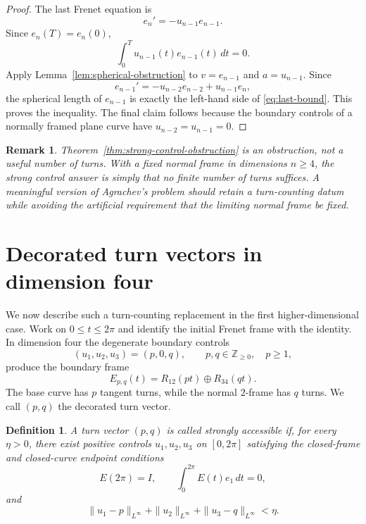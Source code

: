 \documentclass[10pt,a4paper]{amsart}
\newtheorem{definition}[theorem]{Definition}
\newtheorem{remark}[theorem]{Remark}
\begin{document}
\begin{proof}
The last Frenet equation is
\[
        e_n'=-u_{n-1}e_{n-1}.
\]
Since $e_n(T)=e_n(0)$,
\[
        \int_0^T u_{n-1}(t)e_{n-1}(t)\,dt=0.
\]
Apply Lemma~\ref{lem:spherical-obstruction} to $v=e_{n-1}$ and $a=u_{n-1}$.  Since
\[
        e_{n-1}'=-u_{n-2}e_{n-2}+u_{n-1}e_n,
\]
the spherical length of $e_{n-1}$ is exactly the left-hand side of
\eqref{eq:last-bound}.  This proves the inequality.  The final claim follows because
the boundary controls of a normally framed plane curve have $u_{n-2}=u_{n-1}=0$.
\end{proof}

\begin{remark}\label{rem:why-not-number}
Theorem~\ref{thm:strong-control-obstruction} is an obstruction, not a useful number
of turns.  With a fixed normal frame in dimensions $n\ge4$, the strong control answer
is simply that no finite number of turns suffices.  A meaningful version of
Agrachev's problem should retain a turn-counting datum while avoiding the artificial
requirement that the limiting normal frame be fixed.
\end{remark}

\section{Decorated turn vectors in dimension four}

We now describe such a turn-counting replacement in the first higher-dimensional
case.  Work on $0\le t\le2\pi$ and identify the initial Frenet frame with the identity.
In dimension four the degenerate boundary controls
\begin{equation}\label{eq:decorated-control}
        (u_1,u_2,u_3)=(p,0,q),
        \qquad p,q\in\mathbb Z_{\ge0},\quad p\ge1,
\end{equation}
produce the boundary frame
\[
        E_{p,q}(t)=R_{12}(pt)\oplus R_{34}(qt).
\]
The base curve has $p$ tangent turns, while the normal $2$-frame has $q$ turns.  We
call $(p,q)$ the decorated turn vector.

\begin{definition}\label{def:accessible-turn-vector}
A turn vector $(p,q)$ is called \emph{strongly accessible} if, for every $\eta>0$,
there exist positive controls $u_1,u_2,u_3$ on $[0,2\pi]$ satisfying the closed-frame
and closed-curve endpoint conditions
\begin{equation}\label{eq:endpoint-conditions}
        E(2\pi)=I,
        \qquad
        \int_0^{2\pi}E(t)e_1\,dt=0,
\end{equation}
and
\[
        \|u_1-p\|_{L^\infty}+\|u_2\|_{L^\infty}+\|u_3-q\|_{L^\infty}<\eta .
\]
\end{definition}
\end{document}
